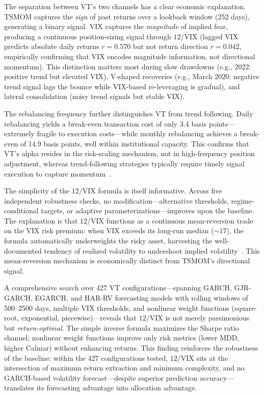 The separation between VT's two channels has a clear economic explanation. TSMOM captures the \textit{sign} of past returns over a lookback window (252 days), generating a binary signal. VIX captures the \textit{magnitude} of implied fear, producing a continuous position-sizing signal through $12/\text{VIX}$ (lagged VIX predicts absolute daily returns $r = 0.570$ but not return direction $r = 0.042$, empirically confirming that VIX encodes magnitude information, not directional momentum). This distinction matters most during slow drawdowns (e.g., 2022: positive trend but elevated VIX), V-shaped recoveries (e.g., March 2020: negative trend signal lags the bounce while VIX-based re-leveraging is gradual), and lateral consolidation (noisy trend signals but stable VIX).

The rebalancing frequency further distinguishes VT from trend following. Daily rebalancing yields a break-even transaction cost of only 3.4 basis points---extremely fragile to execution costs---while monthly rebalancing achieves a break-even of 14.9 basis points, well within institutional capacity. This confirms that VT's alpha resides in the risk-scaling mechanism, not in high-frequency position adjustment, whereas trend-following strategies typically require timely signal execution to capture momentum~\citep{moskowitz2012}.

The simplicity of the $12/\text{VIX}$ formula is itself informative. Across five independent robustness checks, no modification---alternative thresholds, regime-conditional targets, or adaptive parameterizations---improves upon the baseline. The explanation is that $12/\text{VIX}$ functions as a continuous mean-reversion trade on the VIX risk premium: when VIX exceeds its long-run median (${\sim}17$), the formula automatically underweights the risky asset, harvesting the well-documented tendency of realized volatility to undershoot implied volatility~\citep{bozovic2024}. This mean-reversion mechanism is economically distinct from TSMOM's directional signal.

A comprehensive search over 427 VT configurations---spanning GARCH, GJR-GARCH, EGARCH, and HAR-RV forecasting models with rolling windows of 500--2500 days, multiple VIX thresholds, and nonlinear weight functions (square-root, exponential, piecewise)---reveals that $12/\text{VIX}$ is not merely parsimonious but \textit{return-optimal}. The simple inverse formula maximizes the Sharpe ratio channel; nonlinear weight functions improve only risk metrics (lower MDD, higher Calmar) without enhancing returns. This finding reinforces the robustness of the baseline: within the 427 configurations tested, $12/\text{VIX}$ sits at the intersection of maximum return extraction and minimum complexity, and no GARCH-based volatility forecast---despite superior prediction accuracy---translates its forecasting advantage into allocation advantage.

